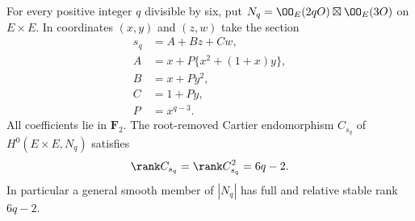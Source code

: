 \begin{lemma}
\label{lem:DE-A3-ss-uniform-sparse}
For every positive integer $q$ divisible by six, put
$N_q=\OO_E(2qO)\boxtimes\OO_E(3O)$ on $E\times E$.
In coordinates $(x,y)$ and $(z,w)$ take the section
\[
\begin{split}
 s_q&=A+Bz+Cw,\\
 A&=x+P\{x^2+(1+x)y\},\\
 B&=x+Py^2,\\
 C&=1+Py,\\
 P&=x^{q-3}.
\end{split}
\]
All coefficients lie in $\mathbf F_2$.  The root-removed Cartier
endomorphism $C_{s_q}$ of $H^0(E\times E,N_q)$ satisfies
\[
             \rank C_{s_q}=\rank C_{s_q}^2=6q-2.
\]
In particular a general smooth member of $|N_q|$ has full and relative
stable rank $6q-2$.
\end{lemma}
